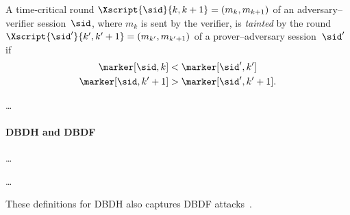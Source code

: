 
\begin{definition}\label{TaintedTF}
  A time-critical round
  \(\Xscript{\sid}{k, k+1} = (m_k, m_{k+1})\)
  of an adversary--verifier session~\(\sid\), where \(m_k\) is sent by the 
  verifier, is \emph{tainted} by the round
  \(\Xscript{\sid'}{k', k'+1} = (m_{k'}, m_{k'+1})\)
  of a prover--adversary session~\(\sid'\) if
  \begin{align*}
    \marker[\sid, k] &< \marker[\sid', k'] \\
    \marker[\sid, k'+1] &> \marker[\sid', k'+1].
  \end{align*}
\end{definition}

\begin{definition}%
  \label{TFresistance}
  \dots
\end{definition}

\paragraph*{\Acl*{DBDH} and \acl*{DBDF}}

\begin{definition}%
  \label{TaintedDH}
  \dots
\end{definition}

\begin{definition}%
  \label{DHresistance}
  \dots
\end{definition}

These definitions for \ac{DBDH} also captures \ac{DBDF} attacks~\cite{TREAD}.
